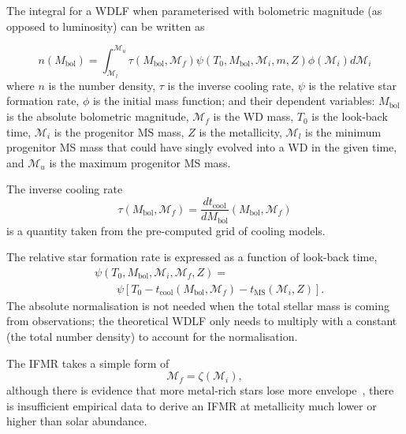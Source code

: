 \documentclass[fleqn,usenatbib]{rasti}
\begin{document}
\citep{2020A&A...636A..31T}



The integral for a WDLF when parameterised with bolometric magnitude (as
opposed to luminosity) can be written as

\begin{equation}
    n(M_{\mathrm{bol}}) = \int_{\mathcal{M}_l}^{\mathcal{M}_u}
        \tau(M_\mathrm{bol}, \mathcal{M}_f)
        \psi(T_0, M_\mathrm{bol}, \mathcal{M}_i, m, Z)
        \phi(\mathcal{M}_i) d\mathcal{M}_i
\end{equation}
where $n$ is the number density, $\tau$ is the inverse cooling rate, $\psi$ is
the relative star formation rate, $\phi$ is the initial mass function; and their
dependent variables: $M_\mathrm{bol}$ is the absolute bolometric
magnitude, $\mathcal{M}_f$ is the WD mass, $T_0$ is the look-back time, $\mathcal{M}_i$ is
the progenitor MS mass, $Z$ is the metallicity, $\mathcal{M}_l$ is the minimum
progenitor MS mass that could have singly evolved into a WD in the given time,
and $\mathcal{M}_u$ is the maximum progenitor MS mass.

The inverse cooling rate
\begin{equation}
    \tau(M_\mathrm{bol}, \mathcal{M}_f) = \dfrac{dt_{\mathrm{cool}}}{dM_\mathrm{bol}} \left( M_\mathrm{bol}, \mathcal{M}_f \right)
\end{equation}
is a quantity taken from the pre-computed grid of cooling models. 

The relative star formation rate is expressed as a function of look-back time,
\begin{align}
    &\psi(T_0, M_\mathrm{bol}, \mathcal{M}_i, \mathcal{M}_f, Z) =\\
    &\qquad\psi\left[T_0 - t_{\mathrm{cool}}\left(M_\mathrm{bol}, \mathcal{M}_f\right) - t_{\mathrm{MS}}\left(\mathcal{M}_i, Z\right)\right].
\end{align}
The absolute normalisation is not needed when the total stellar mass is coming
from observations; the theoretical WDLF only needs to multiply with a
constant (the total number density) to account for the normalisation.

The IFMR takes a simple form of
\begin{equation}
    \mathcal{M}_f = \zeta(\mathcal{M}_i),
\end{equation}
although there is evidence that more metal-rich stars lose more
envelope~\citep{2007ApJ...671..761K}, there is insufficient empirical data to
derive an IFMR at metallicity much lower or higher than solar abundance.
\end{document}
